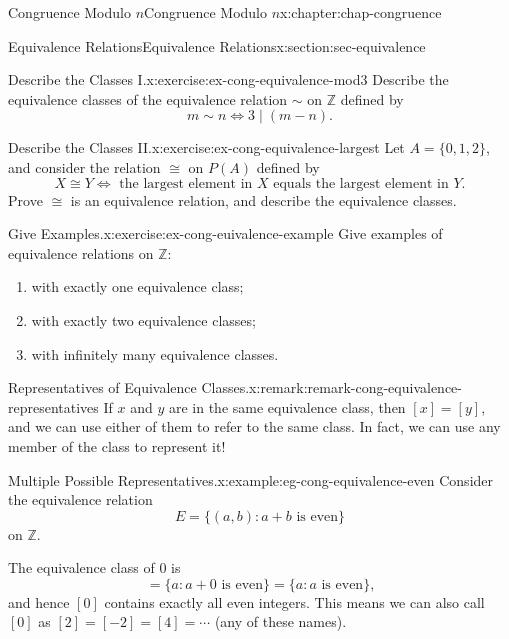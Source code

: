 \documentclass[oneside,10pt,]{book}
\numberwithin{equation}{section}
\begin{document}
\begin{chapterptx}{Congruence Modulo \(n\)}{}{Congruence Modulo \(n\)}{}{}{x:chapter:chap-congruence}
\begin{sectionptx}{Equivalence Relations}{}{Equivalence Relations}{}{}{x:section:sec-equivalence}
\begin{inlineexercise}{Describe the Classes I.}{x:exercise:ex-cong-equivalence-mod3}
Describe the equivalence classes of the equivalence relation \(\sim\) on \(\mathbb{Z}\) defined by%
\begin{equation*}
m \sim n \Leftrightarrow 3 \mid (m - n)\text{.}
\end{equation*}
%
\end{inlineexercise}
\begin{inlineexercise}{Describe the Classes II.}{x:exercise:ex-cong-equivalence-largest}%
Let \(A = \{0,1,2\}\), and consider the relation \(\cong\) on \(P(A)\) defined by%
\begin{equation*}
X \cong Y \Leftrightarrow \text{ the largest element in } X \text{ equals the largest element in } Y\text{.}
\end{equation*}
Prove \(\cong\) is an equivalence relation, and describe the equivalence classes.%
\end{inlineexercise}
\begin{inlineexercise}{Give Examples.}{x:exercise:ex-cong-euivalence-example}%
Give examples of equivalence relations on \(\mathbb{Z}\):%
\begin{enumerate}[label=(\alph*)]
\item{}with exactly one equivalence class;%
\item{}with exactly two equivalence classes;%
\item{}with infinitely many equivalence classes.%
\end{enumerate}
%
\end{inlineexercise}
\begin{remark}{Representatives of Equivalence Classes.}{x:remark:remark-cong-equivalence-representatives}%
If \(x\) and \(y\) are in the same equivalence class, then \([x] = [y]\), and we can use either of them to refer to the same class. In fact, we can use any member of the class to represent it!%
\end{remark}
\begin{example}{Multiple Possible Representatives.}{x:example:eg-cong-equivalence-even}%
Consider the equivalence relation%
\begin{equation*}
E = \{(a,b) : a + b \text{ is even}\}
\end{equation*}
on \(\mathbb{Z}\).%
\par
The equivalence class of \(0\) is%
\begin{equation*}
[0] = \{a : a + 0 \text{ is even}\} = \{a : a \text{ is even}\}\text{,}
\end{equation*}
and hence \([0]\) contains exactly all even integers. This means we can also call \([0]\) as \([2] = [-2] = [4] = \cdots\) (any of these names).%

\end{example}
\end{sectionptx}
\end{chapterptx}
\end{document}
